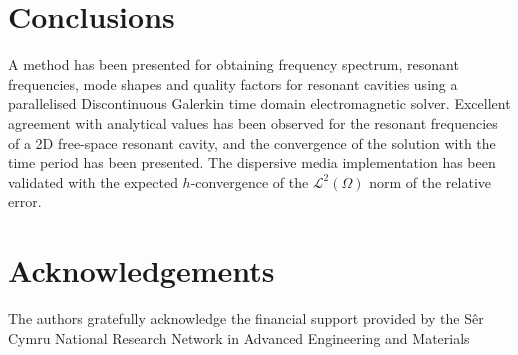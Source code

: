 \documentclass[times,11pt]{ACME2015article}
\begin{document}
%

\section{Conclusions}

A method has been presented for obtaining frequency spectrum, resonant frequencies, mode shapes and quality factors for resonant cavities using a parallelised Discontinuous Galerkin time domain electromagnetic solver. Excellent agreement with analytical values has been observed for the resonant frequencies of a 2D free-space resonant cavity, and the convergence of the solution with the time period has been presented. The dispersive media implementation has been validated with the expected $h$-convergence of the $\mathcal{L}^2(\Omega)$ norm of the relative error.

\section*{Acknowledgements}\label{mypaper_sec:acknowledgements}

The authors gratefully acknowledge the financial support provided by the S\^{e}r Cymru National Research Network in Advanced Engineering and Materials

\nocite{*}


\end{document}
